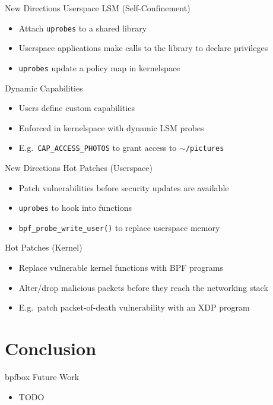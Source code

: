 \documentclass[12pt, dvipsnames, aspectratio=169]{beamer}
\begin{document}
\begin{frame}[c]{New Directions}
Userspace LSM (Self-Confinement)
\begin{itemize}
    \item Attach \texttt{uprobes} to a shared library
    \item Userspace applications make calls to the library to declare privileges
    \item \texttt{uprobes} update a policy map in kernelspace
\end{itemize}
\vfill
Dynamic Capabilities
\begin{itemize}
    \item Users define custom capabilities
    \item Enforced in kernelspace with dynamic LSM probes
    \item E.g.~\texttt{CAP\_ACCESS\_PHOTOS} to grant access to \texttt{$\sim$/pictures}
\end{itemize}
\end{frame}

\begin{frame}[c]{New Directions}
Hot Patches (Userspace)
\begin{itemize}
    \item Patch vulnerabilities before security updates are available
    \item \texttt{uprobes} to hook into functions
    \item \texttt{bpf\_probe\_write\_user()} to replace userspace memory
\end{itemize}
\vfill
Hot Patches (Kernel)
\begin{itemize}
    \item Replace vulnerable kernel functions with BPF programs
    \item Alter/drop malicious packets before they reach the networking stack
    \item E.g.~patch packet-of-death vulnerability with an XDP program
\end{itemize}
\end{frame}

\section{Conclusion}

\begin{frame}[c]{bpfbox Future Work}
\begin{itemize}
    \item TODO
\end{itemize}
\end{frame}
\end{document}
